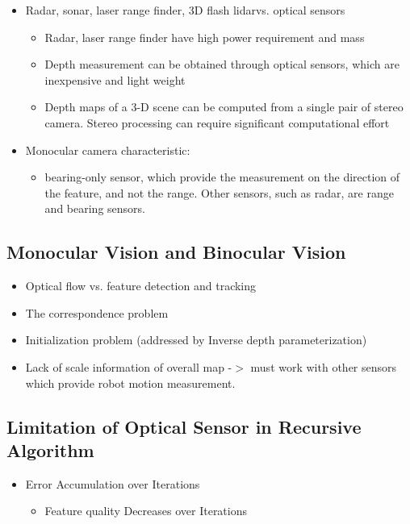 \begin{itemize}
  \item Radar, sonar, laser range finder, 3D flash lidarvs. optical sensors
  \begin{itemize}
    \item Radar, laser range finder have high power requirement and mass
    \item Depth measurement can be obtained through optical sensors, which 
    are inexpensive and light weight
    \item Depth maps of a 3-D scene can be computed from a single pair of 
    stereo camera. Stereo processing can require significant computational 
    effort
  \end{itemize}
  \item Monocular camera characteristic: 
  \begin{itemize}
    \item bearing-only sensor, which provide the measurement on the 
    direction of the feature, and not the range. Other sensors, such as 
    radar, are range and bearing sensors. 
  \end{itemize}
\end{itemize}

\subsection{Monocular Vision and Binocular Vision}\label{sec:MonoBino}
\begin{itemize}
  \item Optical flow vs. feature detection and tracking
  \item The correspondence problem
  \item Initialization problem (addressed by Inverse depth 
  parameterization)
  \item Lack of scale information of overall map -$>$ must work with other 
  sensors which provide robot motion measurement. 
\end{itemize}

\subsection{Limitation of Optical Sensor in Recursive Algorithm}
\label{sec:OpticalSensorLimitation}

\begin{itemize}
  \item Error Accumulation over Iterations
  \begin{itemize}
    \item Feature quality Decreases over Iterations
  \end{itemize}
\end{itemize}


